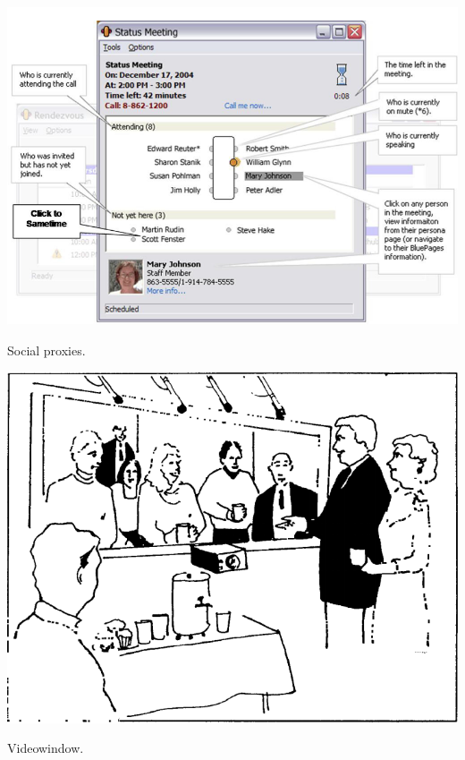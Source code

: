 \documentclass{tufte-handout}
\begin{document}
\begin{marginfigure}
	\includegraphics{figures/kellog_social_proxies.png}
	\caption{Social proxies.}
	\label{fig:social-proxies}
\end{marginfigure}

\begin{marginfigure}
	\includegraphics{figures/videowindow.png}
	\caption{Videowindow.}
	\label{fig:videowindow}
\end{marginfigure}
\end{document}

